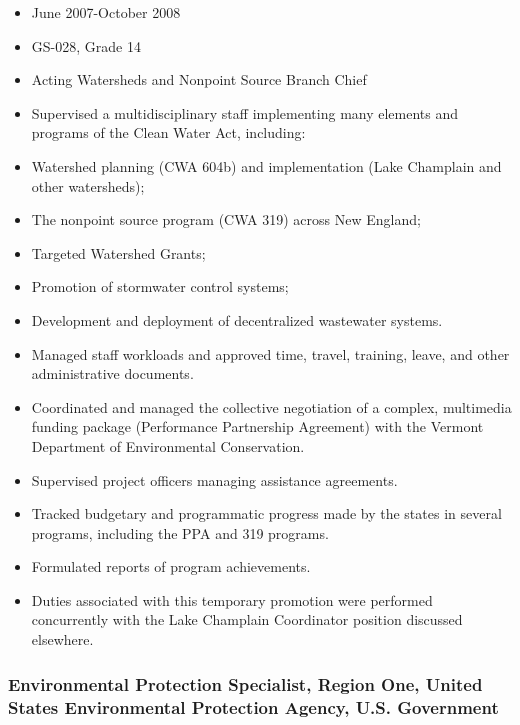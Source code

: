 \documentclass[12pt]{article}
\begin{document}
\begin{itemize}
\item
  June 2007-October 2008
\item
  GS-028, Grade 14
\item
  Acting Watersheds and Nonpoint Source Branch Chief
\item
  Supervised a multidisciplinary staff implementing many elements and
  programs of the Clean Water Act, including:
\item
  Watershed planning (CWA 604b) and implementation (Lake Champlain and
  other watersheds);
\item
  The nonpoint source program (CWA 319) across New England;
\item
  Targeted Watershed Grants;
\item
  Promotion of stormwater control systems;
\item
  Development and deployment of decentralized wastewater systems.
\item
  Managed staff workloads and approved time, travel, training, leave,
  and other administrative documents.
\item
  Coordinated and managed the collective negotiation of a complex,
  multimedia funding package (Performance Partnership Agreement) with
  the Vermont Department of Environmental Conservation.
\item
  Supervised project officers managing assistance agreements.
\item
  Tracked budgetary and programmatic progress made by the states in
  several programs, including the PPA and 319 programs.
\item
  Formulated reports of program achievements.
\item
  Duties associated with this temporary promotion were performed
  concurrently with the Lake Champlain Coordinator position discussed
  elsewhere.
\end{itemize}

\subsubsection{Environmental Protection Specialist, Region One,
United States Environmental Protection Agency, U.S. Government}
\end{document}
